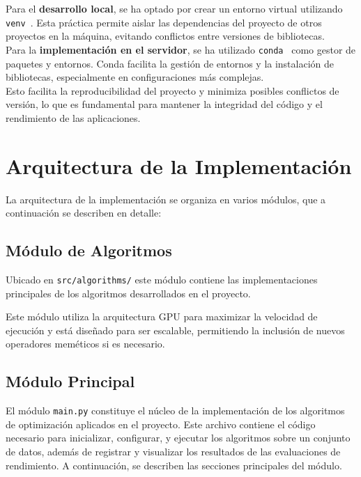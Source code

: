 Para el \textbf{desarrollo local}, se ha optado por crear un entorno virtual utilizando \texttt{venv}~\cite{venv}.
Esta práctica permite aislar las dependencias del proyecto de otros proyectos en la máquina, evitando conflictos entre
versiones de bibliotecas. \\[6pt]

Para la \textbf{implementación en el servidor}, se ha utilizado \texttt{conda}~\cite{conda} como gestor de paquetes y
entornos.
Conda facilita la gestión de entornos y la instalación de bibliotecas, especialmente en configuraciones más complejas.
\\[6pt]

Esto facilita la reproducibilidad del proyecto y minimiza posibles conflictos de versión, lo que es fundamental para
mantener la integridad del código y el rendimiento de las aplicaciones.

\section{Arquitectura de la Implementación}\label{sec:arquitectura-de-la-implementacion}
La arquitectura de la implementación se organiza en varios módulos, que a continuación se describen en detalle:

\subsection{Módulo de Algoritmos}\label{subsec:modulo-de-algoritmos}
Ubicado en \texttt{src/algorithms/} este módulo contiene las implementaciones principales de los
algoritmos desarrollados en el proyecto.

Este módulo utiliza la arquitectura GPU para maximizar la velocidad de ejecución y está diseñado para ser escalable,
permitiendo la inclusión de nuevos operadores meméticos si es necesario.

\subsection{Módulo Principal}\label{subsec:modulo-principal}
El módulo \texttt{main.py} constituye el núcleo de la implementación de los algoritmos de optimización aplicados en el
proyecto.
Este archivo contiene el código necesario para inicializar, configurar, y ejecutar los algoritmos sobre un conjunto de
datos, además de registrar y visualizar los resultados de las evaluaciones de rendimiento.
A continuación, se describen las secciones principales del módulo. \\[6pt]

